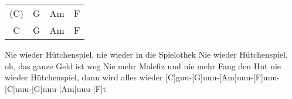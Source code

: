 \begin{guitar}
	{\footnotesize\begin{tabular}{c|c|c|c}
			(C) & G & Am & F\\
			C & G & Am & F
	\end{tabular}}

	Nie wieder Hütchenspiel, nie wieder in die Spielothek
	Nie wieder Hütchenspiel, oh, das ganze Geld ist weg
	Nie mehr Malefiz und nie mehr Fang den Hut
	nie wieder Hütchenspiel, dann wird alles wieder
	[C]guu-[G]uuu-[Am]uuu-[F]uuu-[C]uuu-[G]uuu-[Am]uuu-[F]t
	
	\vspace{-1em}
\end{guitar}


